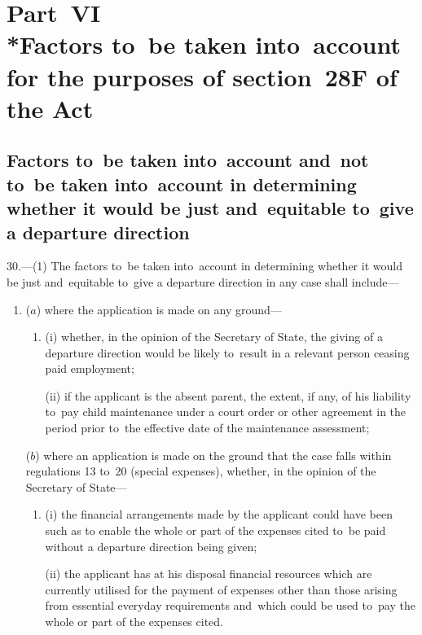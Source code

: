 \documentclass[12pt,a4paper]{article}
\begin{document}
\section[Part~VI --- Factors to~be taken into~account for the purposes of section~28F of the Act]{Part~VI\\*Factors to~be taken into~account for the purposes of section~28F of the Act}

\renewcommand\parthead{--- Part~VI}

\subsection[30. Factors to~be taken into~account and~not to~be taken into~account in
determining whether it would be just and~equitable to~give a departure
direction]{Factors to~be taken into~account and~not to~be taken into~account in
determining whether it would be just and~equitable to~give a departure
direction}

30.—(1) The factors to~be taken into~account in determining whether it
would be just and~equitable to~give a departure direction in any case shall
include—
\begin{enumerate}\item[]
($a$) where the application is made on any ground—
\begin{enumerate}\item[]
(i) whether, in the opinion of the Secretary of State, the giving of a departure
direction would be likely to~result in a relevant person ceasing paid
employment;

(ii) if the applicant is the absent parent, the extent, if any, of his liability
to~pay child maintenance under a court order or other agreement in the period
prior to~the effective date of the maintenance assessment;
\end{enumerate}

($b$) where an application is made on the ground that the case falls within
regulations 13 to~20 (special expenses), whether, in the opinion of the
Secretary of State—
\begin{enumerate}\item[]
(i) the financial arrangements made by the applicant could have been such as to
enable the whole or part of the expenses cited to~be paid without a departure
direction being given;

(ii) the applicant has at his disposal financial resources which are currently
utilised for the payment of expenses other than those arising from essential
everyday requirements and~which could be used to~pay the whole or part of the
expenses cited.
\end{enumerate}
\end{enumerate}
\end{document}
